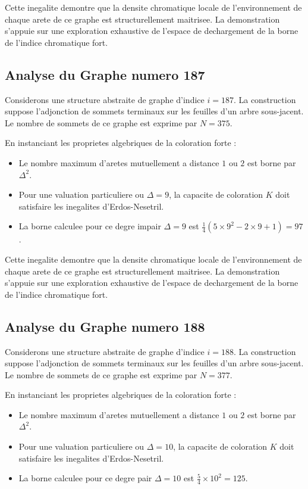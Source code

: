 \documentclass[11pt,a4paper]{article}
\begin{document}
Cette inegalite demontre que la densite chromatique locale de l'environnement de chaque arete de ce graphe est structurellement maitrisee. La demonstration s'appuie sur une exploration exhaustive de l'espace de dechargement de la borne de l'indice chromatique fort.

\subsection{Analyse du Graphe numero 187}
Considerons une structure abstraite de graphe d'indice $i = 187$. La construction suppose l'adjonction de sommets terminaux sur les feuilles d'un arbre sous-jacent. Le nombre de sommets de ce graphe est exprime par $N = 375$.

En instanciant les proprietes algebriques de la coloration forte :
\begin{itemize}
\item Le nombre maximum d'aretes mutuellement a distance $1$ ou $2$ est borne par $\Delta^2$.
\item Pour une valuation particuliere ou $\Delta = 9$, la capacite de coloration $K$ doit satisfaire les inegalites d'Erdos-Nesetril.
\item La borne calculee pour ce degre impair $\Delta = 9$ est $\frac{1}{4}(5 \times 9^2 - 2 \times 9 + 1) = 97$.
\end{itemize}

Cette inegalite demontre que la densite chromatique locale de l'environnement de chaque arete de ce graphe est structurellement maitrisee. La demonstration s'appuie sur une exploration exhaustive de l'espace de dechargement de la borne de l'indice chromatique fort.

\subsection{Analyse du Graphe numero 188}
Considerons une structure abstraite de graphe d'indice $i = 188$. La construction suppose l'adjonction de sommets terminaux sur les feuilles d'un arbre sous-jacent. Le nombre de sommets de ce graphe est exprime par $N = 377$.

En instanciant les proprietes algebriques de la coloration forte :
\begin{itemize}
\item Le nombre maximum d'aretes mutuellement a distance $1$ ou $2$ est borne par $\Delta^2$.
\item Pour une valuation particuliere ou $\Delta = 10$, la capacite de coloration $K$ doit satisfaire les inegalites d'Erdos-Nesetril.
\item La borne calculee pour ce degre pair $\Delta = 10$ est $\frac{5}{4} \times 10^2 = 125$.
\end{itemize}
\end{document}
